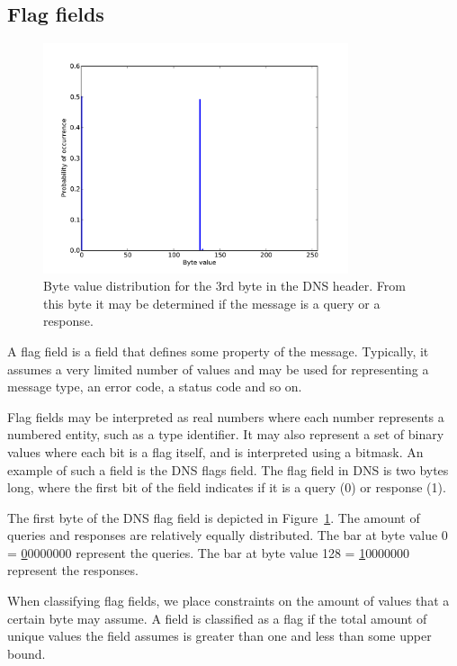 \documentclass[a4paper]{report}
\begin{document}
\newpage

\subsection{Flag fields}
\begin{figure}[h]
    \centering
    \includegraphics[width=0.8\textwidth]{img/flag}
    \captionsetup{width=0.8\textwidth}
    \caption{Byte value distribution for the 3rd byte in the DNS header.
    From this byte it may be determined if the message is a query or a
    response.}
    \label{fig:flag}
\end{figure}

A flag field is a field that defines some property of the message. Typically,
it assumes a very limited number of values and may be used for representing
a message type, an error code, a status code and so on.

Flag fields may be interpreted as real numbers where each number represents a numbered entity, such as a
type identifier. It may also represent a set of binary values where each bit
is a flag itself, and is interpreted using a bitmask. An example of such a
field is the DNS flags field. The flag field in DNS is two bytes long, where
the first bit of the field indicates if it is a query (0) or response (1).

The first byte of the DNS flag field is depicted in Figure~\ref{fig:flag}.
The amount of queries and responses are relatively equally distributed. The
bar at byte value 0 = \underline{0}0000000 represent the queries. The bar at
byte value 128 = \underline{1}0000000 represent the responses.

When classifying flag fields, we place constraints on the amount of values that
a certain byte may assume. A field is classified as a flag if the total amount
of unique values the field assumes is greater than one and less than some upper
bound.
\end{document}
